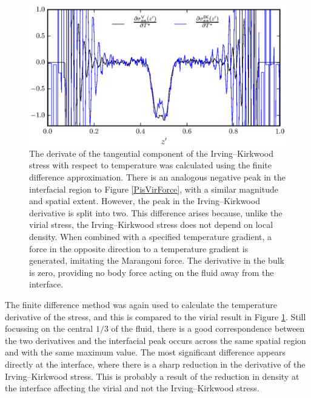 \begin{figure}[h!]
\centering
\includegraphics[scale=1.0]{PisIKForce}
\caption{The derivate of the tangential component of the Irving--Kirkwood stress with respect to temperature was calculated using the finite difference approximation.
There is an analogous negative peak in the interfacial region to Figure \ref{PisVirForce}, with a similar magnitude and spatial extent.
However, the peak in the Irving--Kirkwood derivative is split into two.
This difference arises because, unlike the virial stress, the Irving--Kirkwood stress does not depend on local density.
When combined with a specified temperature gradient, a force in the opposite direction to a temperature gradient is generated, imitating the Marangoni force.
The derivative in the bulk is zero, providing no body force acting on the fluid away from the interface.
}
\label{PisIKForce}
\end{figure}
The finite difference method was again used to calculate the temperature derivative of the stress, and this is compared to the virial result in Figure \ref{PisIKForce}.
Still focussing on the central $1/3$ of the fluid, there is a good correspondence between the two derivatives and the interfacial peak occurs across the same spatial region and with the same maximum value.
The most significant difference appears directly at the interface, where there is a sharp reduction in the derivative of the Irving--Kirkwood stress.
This is probably a result of the reduction in density at the interface affecting the virial and not the Irving--Kirkwood stress.
\FloatBarrier

